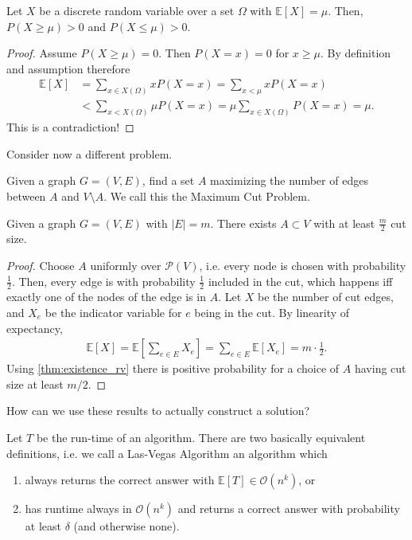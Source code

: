 \begin{lemma}\label{thm:existence_rv}
    Let $X$ be a discrete random variable over a set $\Omega$ with $\mathbb{E}[X]= \mu$.
    Then, $P(X \geq \mu) > 0$ and $P(X \leq \mu) >0$.
\end{lemma}
\begin{proof}
    Assume $P(X \geq \mu) = 0$.
    Then $P(X = x) = 0$ for $x \geq \mu$.
    By definition and assumption therefore
    \begin{align}
        \mathbb{E}[X] & = \sum_{x \in X(\Omega)}x P(X=x) = \sum_{x < \mu}x P(X=x)                   \\
                      & < \sum_{x < X(\Omega)}\mu P(X=x) = \mu \sum_{x \in X(\Omega)} P(X=x) = \mu.
    \end{align}
    This is a contradiction!
\end{proof}
Consider now a different problem.
\begin{definition}
    Given a graph $G=(V,E)$, find a set $A$ maximizing the number of edges between $A$ and $V \setminus A$.
    We call this the Maximum Cut Problem.
\end{definition}
\begin{theorem}
    Given a graph $G = (V,E)$ with $|E|=m$.
    There exists $A \subset V$ with at least $\frac{m}{2}$ cut size.
\end{theorem}
\begin{proof}
    Choose $A$ uniformly over $\mathcal{P}(V)$, i.e. every node is chosen with probability $\frac{1}{2}$.
    Then, every edge is with probability $\frac{1}{2}$ included in the cut,
    which happens iff exactly one of the nodes of the edge is in $A$.
    Let $X$ be the number of cut edges, and $X_e$ be the indicator variable for $e$ being in the cut.
    By linearity of expectancy,
    \begin{align}
        \mathbb{E}[X]=\mathbb{E}\left[\sum_{e \in E}X_e\right]=\sum_{e \in E}\mathbb{E}[X_e]=m \cdot \frac{1}{2}.
    \end{align}
    Using \autoref{thm:existence_rv} there is positive probability for a choice of $A$ having cut size at least $m/2$.
\end{proof}
How can we use these results to actually construct a solution?
\begin{definition}
    Let $T$ be the run-time of an algorithm.
    There are two basically equivalent definitions, i.e. we call a Las-Vegas Algorithm an algorithm which
    \begin{enumerate}
        \item always returns the correct answer
              with $\mathbb{E}[T] \in \mathcal{O}(n^k)$, or
        \item has runtime always in $\mathcal{O}(n^k)$ and returns a correct answer with probability at least $\delta$
              (and otherwise none).
    \end{enumerate}
\end{definition}
